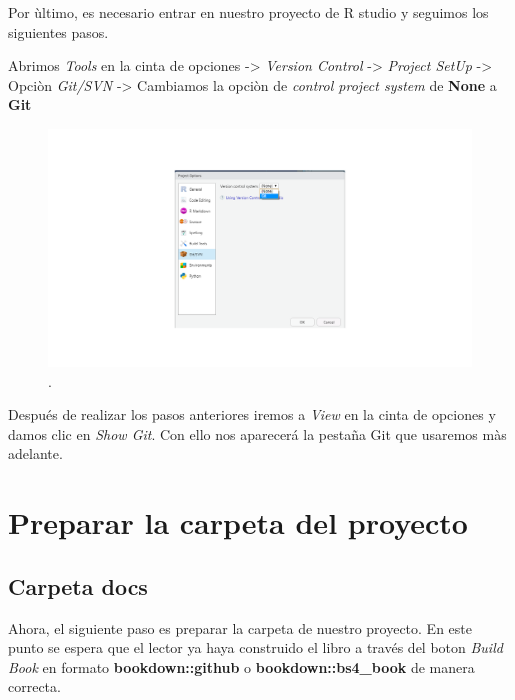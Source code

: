 \documentclass[
  11pt,
  spanish,
  oneside]{book}
\begin{document}
Por ùltimo, es necesario entrar en nuestro proyecto de R studio y seguimos los siguientes pasos.

Abrimos \emph{Tools} en la cinta de opciones -\textgreater{} \emph{Version Control} -\textgreater{} \emph{Project SetUp} -\textgreater{} Opciòn \emph{Git/SVN} -\textgreater{} Cambiamos la opciòn de \emph{control project system} de \textbf{None} a \textbf{Git}

\begin{figure}

{\centering \includegraphics[width=1\linewidth]{imagenes/Imagen 4} 

}

\caption{.}\label{fig:unnamed-chunk-4}
\end{figure}

Después de realizar los pasos anteriores iremos a \emph{View} en la cinta de opciones y damos clic en \emph{Show Git}. Con ello nos aparecerá la pestaña Git que usaremos màs adelante.

\hypertarget{preparar-la-carpeta-del-proyecto}{%
\chapter*{Preparar la carpeta del proyecto}\label{preparar-la-carpeta-del-proyecto}}

\hypertarget{carpeta-docs}{%
\section*{Carpeta docs}\label{carpeta-docs}}

Ahora, el siguiente paso es preparar la carpeta de nuestro proyecto. En este punto se espera que el lector ya haya construido el libro a través del boton \emph{Build Book} en formato \textbf{bookdown::github} o \textbf{bookdown::bs4\_book} de manera correcta.
\end{document}
